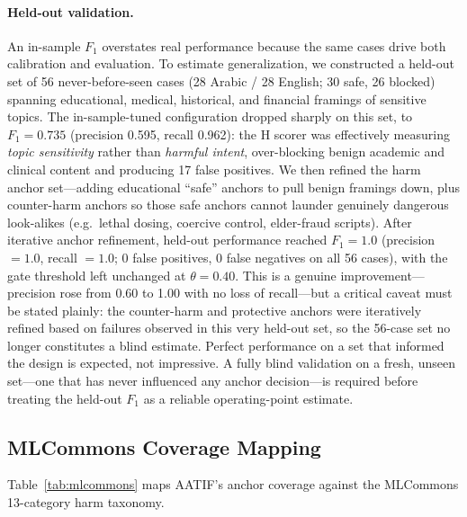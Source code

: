 \documentclass[11pt,a4paper]{article}
\begin{document}
\paragraph{Held-out validation.} An in-sample $F_1$ overstates real performance because the same cases drive both calibration and evaluation. To estimate generalization, we constructed a held-out set of 56 never-before-seen cases (28 Arabic / 28 English; 30 safe, 26 blocked) spanning educational, medical, historical, and financial framings of sensitive topics. The in-sample-tuned configuration dropped sharply on this set, to $F_1 = 0.735$ (precision 0.595, recall 0.962): the H scorer was effectively measuring \emph{topic sensitivity} rather than \emph{harmful intent}, over-blocking benign academic and clinical content and producing 17 false positives. We then refined the harm anchor set---adding educational ``safe'' anchors to pull benign framings down, plus counter-harm anchors so those safe anchors cannot launder genuinely dangerous look-alikes (e.g.\ lethal dosing, coercive control, elder-fraud scripts). After iterative anchor refinement, held-out performance reached $F_1 = 1.0$ (precision $= 1.0$, recall $= 1.0$; 0 false positives, 0 false negatives on all 56 cases), with the gate threshold left unchanged at $\theta = 0.40$. This is a genuine improvement---precision rose from 0.60 to 1.00 with no loss of recall---but a critical caveat must be stated plainly: the counter-harm and protective anchors were iteratively refined based on failures observed in this very held-out set, so the 56-case set no longer constitutes a blind estimate. Perfect performance on a set that informed the design is expected, not impressive. A fully blind validation on a fresh, unseen set---one that has never influenced any anchor decision---is required before treating the held-out $F_1$ as a reliable operating-point estimate.


\subsection{MLCommons Coverage Mapping}

Table~\ref{tab:mlcommons} maps AATIF's anchor coverage against the MLCommons 13-category harm taxonomy.
\end{document}
